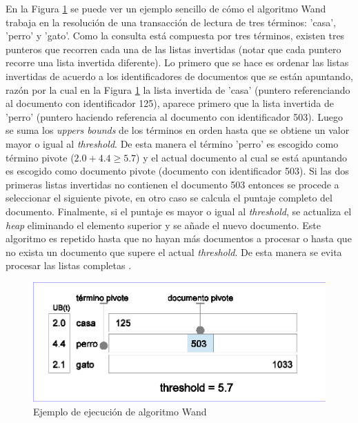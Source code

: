 En la Figura \ref{fig:proceso_wand} se puede ver un ejemplo sencillo de cómo el algoritmo Wand trabaja en la resolución de una transacción de lectura de tres términos: 'casa', 'perro' y 'gato'. Como la consulta está compuesta por tres términos, existen tres punteros que recorren cada una de las listas invertidas (notar que cada puntero recorre una lista invertida diferente). Lo primero que se hace es ordenar las listas invertidas de acuerdo a los identificadores de documentos que se están apuntando, razón por la cual en la Figura \ref{fig:proceso_wand} la lista invertida de 'casa' (puntero referenciando al documento con identificador 125), aparece primero que la lista invertida de 'perro' (puntero haciendo referencia al documento con identificador 503). Luego se suma los \textit{uppers bounds} de los términos en orden hasta que se obtiene un valor mayor o igual al \textit{threshold}. De esta manera el término 'perro' es escogido como término pivote ($2.0 + 4.4 \geq 5.7$) y el actual documento al cual se está apuntando es escogido como documento pivote (documento con identificador 503). Si las dos primeras listas invertidas no contienen el documento 503 entonces se procede a seleccionar el siguiente pivote, en otro caso se calcula el puntaje completo del documento. Finalmente, si el puntaje es mayor o igual al \textit{threshold}, se actualiza el \textit{heap} eliminando el elemento superior y se añade el nuevo documento. 
Este algoritmo es repetido hasta que no hayan más documentos a procesar o hasta que no exista un documento que supere el actual \textit{threshold}. De esta manera se evita procesar las listas completas \citep{Blanco:2010}.

\begin{figure}[!th]
\centering
\includegraphics[scale=.75]{images/proceso_wand.eps}
\caption{Ejemplo de ejecución de algoritmo Wand}
\label{fig:proceso_wand}
\end{figure}

